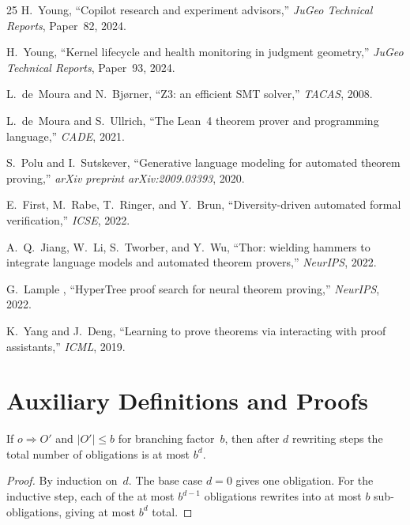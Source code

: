 \documentclass[11pt]{article}
\begin{document}
\begin{thebibliography}{25}
H.~Young,
``Copilot research and experiment advisors,''
\emph{JuGeo Technical Reports}, Paper~82, 2024.

H.~Young,
``Kernel lifecycle and health monitoring in judgment geometry,''
\emph{JuGeo Technical Reports}, Paper~93, 2024.

L.~de~Moura and N.~Bj{\o}rner,
``Z3: an efficient SMT solver,''
\emph{TACAS}, 2008.

L.~de~Moura and S.~Ullrich,
``The Lean~4 theorem prover and programming language,''
\emph{CADE}, 2021.

S.~Polu and I.~Sutskever,
``Generative language modeling for automated theorem proving,''
\emph{arXiv preprint arXiv:2009.03393}, 2020.

E.~First, M.~Rabe, T.~Ringer, and Y.~Brun,
``Diversity-driven automated formal verification,''
\emph{ICSE}, 2022.

A.~Q.~Jiang, W.~Li, S.~Tworber, and Y.~Wu,
``Thor: wielding hammers to integrate language models and
automated theorem provers,''
\emph{NeurIPS}, 2022.

G.~Lample \etal{},
``HyperTree proof search for neural theorem proving,''
\emph{NeurIPS}, 2022.

K.~Yang and J.~Deng,
``Learning to prove theorems via interacting with proof
assistants,''
\emph{ICML}, 2019.

\end{thebibliography}

\appendix

\section{Auxiliary Definitions and Proofs}\label{app:proofs}

\begin{lemma}%
\label{lem:rewritebound}
If $o \Rightarrow O'$ and $|O'| \leq b$ for branching
factor~$b$, then after $d$ rewriting steps the total
number of obligations is at most $b^d$.
\end{lemma}
\begin{proof}
By induction on~$d$.  The base case $d = 0$ gives one
obligation.  For the inductive step, each of the at most
$b^{d-1}$ obligations rewrites into at most $b$ sub-obligations,
giving at most $b^d$ total.
\end{proof}
\end{document}
